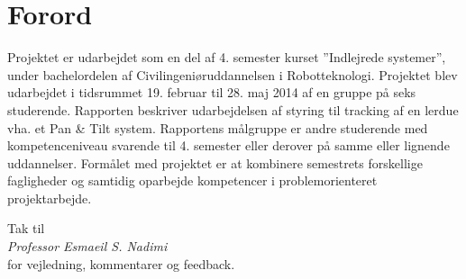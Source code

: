 \section*{Forord}
Projektet er udarbejdet som en del af 4. semester kurset ”Indlejrede systemer”, under bachelordelen af Civilingeniøruddannelsen i Robotteknologi. 
Projektet blev udarbejdet i tidsrummet 19. februar til 28. maj 2014 af en gruppe på seks studerende.
Rapporten beskriver udarbejdelsen af styring til tracking af en lerdue vha. et Pan \& Tilt system.
Rapportens målgruppe er andre studerende med kompetenceniveau svarende til 4. semester eller derover på samme eller lignende uddannelser.
Formålet med projektet er at kombinere semestrets forskellige fagligheder og samtidig oparbejde kompetencer i problemorienteret projektarbejde.
\bigskip
\begin{center}
Tak til \\
\textit{Professor Esmaeil S. Nadimi} \\ 
for vejledning, kommentarer og feedback.
\end{center}





